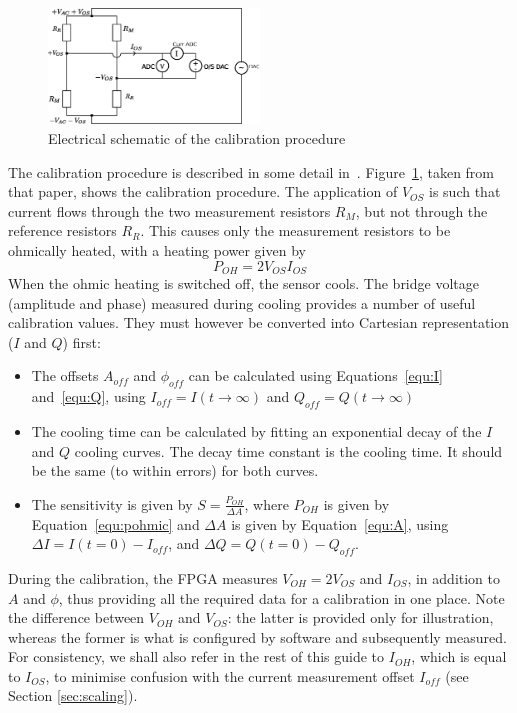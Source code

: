 \documentclass[12pt,a4paper]{article}
\begin{document}
\begin{figure}
  \centering
  \includegraphics[width=0.5\textwidth]{calibration.eps}
  \caption{Electrical schematic of the calibration procedure\label{fig:calibration}}
\end{figure}

The calibration procedure is described in some detail in~\cite{lovell-2015}. Figure~\ref{fig:calibration}, taken from that paper, shows the calibration
procedure. The application of $V_{OS}$ is such that current flows through the two measurement resistors $R_M$, but not through the reference resistors
$R_R$. This causes only the measurement resistors to be ohmically heated, with a heating power given by
\begin{equation}
  \label{equ:pohmic}
  P_{OH} = 2 V_{OS} I_{OS}
\end{equation}
When the ohmic heating is switched off, the sensor cools. The bridge voltage (amplitude and phase) measured during cooling provides a number of useful
calibration values. They must however be converted into Cartesian representation ($I$ and $Q$) first:
\begin{itemize}
\item{The offsets $A_{off}$ and $\phi_{off}$ can be calculated using Equations~\ref{equ:I} and~\ref{equ:Q}, using $I_{off} = I(t\rightarrow\infty)$ and $Q_{off}
    = Q(t\rightarrow\infty)$}
\item{The cooling time can be calculated by fitting an exponential decay of the $I$ and $Q$ cooling curves. The decay time constant is the cooling time.
    It should be the same (to within errors) for both curves.}
\item{The sensitivity is given by $S = \frac{P_{OH}}{\Delta A}$, where $P_{OH}$ is given by Equation~\ref{equ:pohmic} and $\Delta A$ is given by
    Equation~\ref{equ:A}, using $\Delta I = I(t=0) - I_{off}$, and $\Delta Q = Q(t=0) - Q_{off}$.}
\end{itemize}
During the calibration, the FPGA measures $V_{OH} = 2V_{OS}$ and $I_{OS}$, in addition to $A$ and $\phi$, thus providing all the required data for a
calibration in one place. Note the difference between $V_{OH}$ and $V_{OS}$: the latter is provided only for illustration, whereas the former is what
is configured by software and subsequently measured. For consistency, we shall also refer in the rest of this guide to $I_{OH}$, which is equal to
$I_{OS}$, to minimise confusion with the current measurement offset $I_{off}$ (see Section \ref{sec:scaling}).
\end{document}
